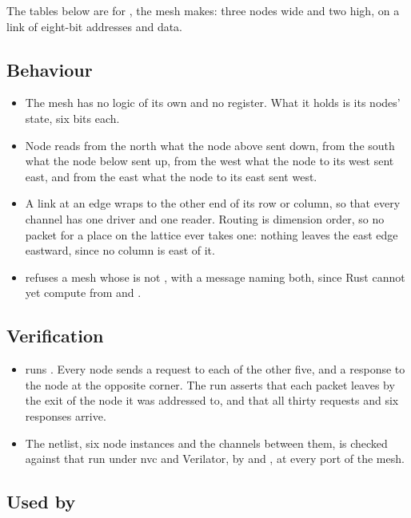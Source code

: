 The tables below are for , the
mesh  makes: three nodes wide and two high, on a link
of eight-bit addresses and data.


\subsection*{Behaviour}

\begin{itemize}
\item The mesh has no logic of its own and no register. What it holds
is its nodes' state, six bits each.
\item Node  reads from the north what the node above sent
down, from the south what the node below sent up, from the west what
the node to its west sent east, and from the east what the node to its
east sent west.
\item A link at an edge wraps to the other end of its row or column,
so that every channel has one driver and one reader. Routing is
dimension order, so no packet for a place on the lattice ever takes
one: nothing leaves the east edge eastward, since no column is east of
it.
\item {} refuses a mesh whose  is not
, with a message naming both, since Rust cannot yet
compute  from  and .
\end{itemize}

\subsection*{Verification}

\begin{itemize}
\item {} runs . Every node sends a
request to each of the other five, and a response to the node at the
opposite corner. The run asserts that each packet leaves by the exit
of the node it was addressed to, and that all thirty requests and six
responses arrive.
\item The netlist, six node instances and the channels between them,
is checked against that run under nvc and Verilator, by
 and ,
at every port of the mesh.
\end{itemize}

\subsection*{Used by}

